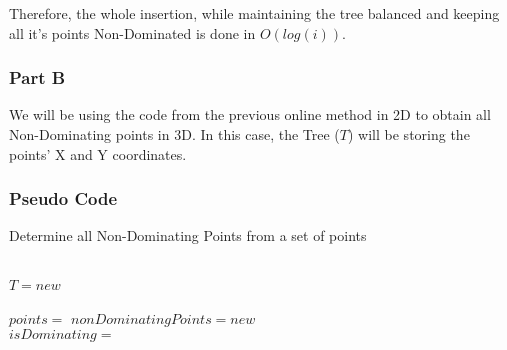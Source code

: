 \documentclass{article}
\begin{document}
                Therefore, the whole insertion, while maintaining the tree balanced and keeping all it's points Non-Dominated is done in $O(log(i))$.


        
        
        \subsubsection*{Part B}
            
            We will be using the code from the previous online method in 2D to obtain all Non-Dominating points in 3D. In this case, the Tree ($T$) will be storing the points' X and Y coordinates.
            
            \subsubsection*{Pseudo Code}
            
                \begin{algorithm}[H]
                    \caption{Determine all Non-Dominating Points from a set of points}
                        \begin{algorithmic}[0]
                            \\
                            \State $T = new$  
                            \\
                             
                                \\
                                \State $points = $  
                                \State $nonDominatingPoints = new$ 
                                \\
                                    \State $isDominating = $  
                                    \\
                                        \State {}
                                    \EndIf
                                \EndFor
                                \\
                                \State {}
                            \EndProcedure
                        
                    \end{algorithmic}
                \end{algorithm}
            
\end{document}
